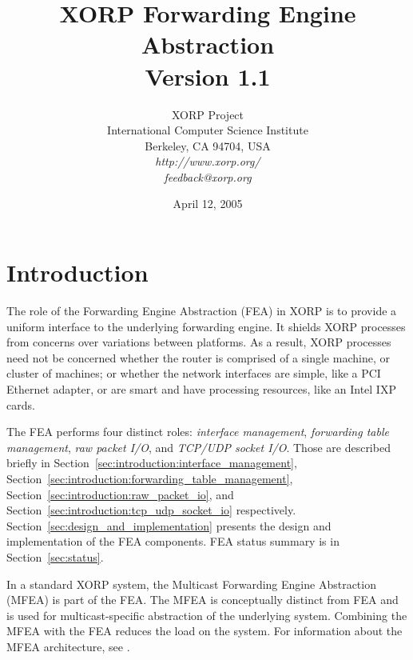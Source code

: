 \documentclass[11pt]{article}
\begin{document}
\title{XORP Forwarding Engine Abstraction \\
\vspace{1ex}
Version 1.1}
\author{ XORP Project					\\
	 International Computer Science Institute	\\
	 Berkeley, CA 94704, USA			\\
         {\it http://www.xorp.org/}			\\
	 {\it feedback@xorp.org}
}
\date{April 12, 2005}

\maketitle

\thispagestyle{empty}


\section{Introduction}
\label{sec:introduction}

The role of the Forwarding Engine Abstraction (FEA) in XORP is to
provide a uniform interface to the underlying forwarding engine.  It
shields XORP processes from concerns over variations between
platforms.  As a result, XORP processes need not be concerned whether
the router is comprised of a single machine, or cluster of machines;
or whether the network interfaces are simple, like a PCI Ethernet
adapter, or are smart and have processing resources, like an Intel IXP
cards.

The FEA performs four distinct roles: \emph{interface management},
\emph{forwarding table management}, \emph{raw packet I/O},
and \emph{TCP/UDP socket I/O}.  Those are
described briefly in
Section~\ref{sec:introduction:interface_management},
Section~\ref{sec:introduction:forwarding_table_management},
Section~\ref{sec:introduction:raw_packet_io},
and Section~\ref{sec:introduction:tcp_udp_socket_io}
respectively.
Section~\ref{sec:design_and_implementation} presents
the design and implementation of the FEA components.
FEA status summary is in Section~\ref{sec:status}.

In a standard XORP system, the Multicast Forwarding Engine Abstraction
(MFEA) is part of the FEA.  The MFEA is conceptually distinct from
FEA and is used for multicast-specific abstraction of the underlying system.
Combining the MFEA with the FEA reduces the load on the system.  For
information about the MFEA architecture, see \cite{xorp:mfea}.
\end{document}
